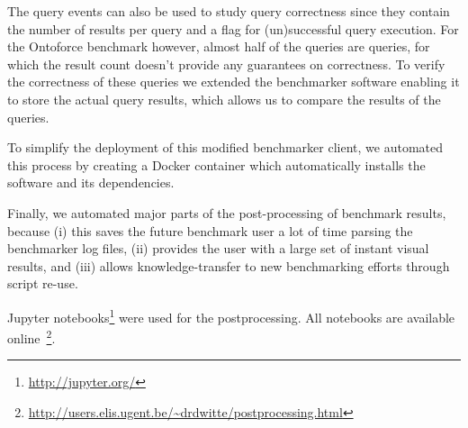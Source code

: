 \begin{table}[ht!]
	\centering
	\caption{Content of the query events used as the starting point for all benchmark results in this work}
	\label{table:queryevents}
\end{table}

The query events can also be used to study query correctness since they contain the number of results per query and a flag for (un)successful query execution. For the Ontoforce benchmark however, almost half of the queries are  queries, for which the result count doesn't provide any guarantees on correctness. 
To verify the correctness of these queries we extended the benchmarker software enabling it to store the actual query results, which allows us to compare the results of the  queries. 

To simplify the deployment of this modified benchmarker client, we automated this process by creating a Docker container which automatically installs the software and its dependencies.

Finally, we automated major parts of the post-processing of benchmark results, because (i) this saves the future benchmark user a lot of time parsing the benchmarker log files, (ii) provides the user with a large set of instant visual results, and (iii) allows knowledge-transfer to new benchmarking efforts through script re-use.

Jupyter notebooks\footnote{\scriptsize \url{http://jupyter.org/}} were used for the postprocessing. All notebooks are available online~\footnote{\scriptsize \url{http://users.elis.ugent.be/~drdwitte/postprocessing.html}}. 

